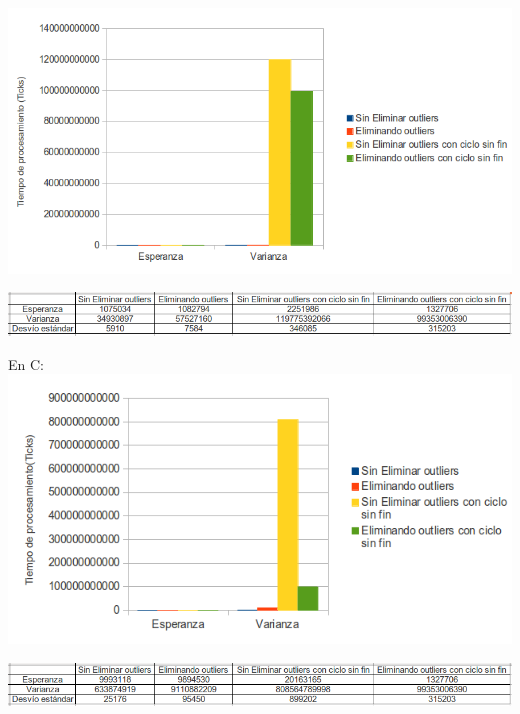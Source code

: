 \documentclass{article}
\begin{document}
\includegraphics[width=\textwidth,height=\textheight,keepaspectratio
]{graficoasm.png}
\begin {flushleft}
\end{flushleft}
\vspace{0.4cm}
\includegraphics[width=\textwidth,height=\textheight,keepaspectratio
]{tablaASM.png}
\begin {flushleft}
\end{flushleft}
\newpage
En C: \newline
\includegraphics[width=\textwidth,height=\textheight,keepaspectratio
]{graficoC.png}
\begin {flushleft}
\end{flushleft}
\vspace{0.4cm}
\includegraphics[width=\textwidth,height=\textheight,keepaspectratio
]{tablaC.png}
\begin {flushleft}
\end{flushleft}
\end{document}
